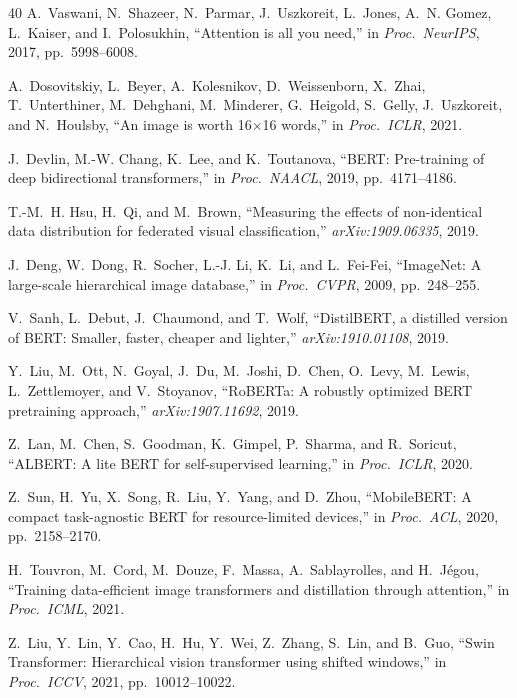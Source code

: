 \documentclass[conference]{IEEEtran}
\begin{document}
\begin{thebibliography}{40}
A.~Vaswani, N.~Shazeer, N.~Parmar, J.~Uszkoreit, L.~Jones,
A.~N. Gomez, L.~Kaiser, and I.~Polosukhin,
``Attention is all you need,''
in \emph{Proc.\ NeurIPS}, 2017, pp.\ 5998--6008.

A.~Dosovitskiy, L.~Beyer, A.~Kolesnikov, D.~Weissenborn, X.~Zhai,
T.~Unterthiner, M.~Dehghani, M.~Minderer, G.~Heigold, S.~Gelly,
J.~Uszkoreit, and N.~Houlsby,
``An image is worth 16$\times$16 words,'' in \emph{Proc.\ ICLR}, 2021.

J.~Devlin, M.-W. Chang, K.~Lee, and K.~Toutanova,
``BERT: Pre-training of deep bidirectional transformers,''
in \emph{Proc.\ NAACL}, 2019, pp.\ 4171--4186.

T.-M.~H. Hsu, H.~Qi, and M.~Brown,
``Measuring the effects of non-identical data distribution for federated
visual classification,'' \emph{arXiv:1909.06335}, 2019.

J.~Deng, W.~Dong, R.~Socher, L.-J. Li, K.~Li, and L.~Fei-Fei,
``ImageNet: A large-scale hierarchical image database,''
in \emph{Proc.\ CVPR}, 2009, pp.\ 248--255.

V.~Sanh, L.~Debut, J.~Chaumond, and T.~Wolf,
``DistilBERT, a distilled version of BERT: Smaller, faster, cheaper and lighter,''
\emph{arXiv:1910.01108}, 2019.

Y.~Liu, M.~Ott, N.~Goyal, J.~Du, M.~Joshi, D.~Chen, O.~Levy,
M.~Lewis, L.~Zettlemoyer, and V.~Stoyanov,
``RoBERTa: A robustly optimized BERT pretraining approach,''
\emph{arXiv:1907.11692}, 2019.

Z.~Lan, M.~Chen, S.~Goodman, K.~Gimpel, P.~Sharma, and R.~Soricut,
``ALBERT: A lite BERT for self-supervised learning,''
in \emph{Proc.\ ICLR}, 2020.

Z.~Sun, H.~Yu, X.~Song, R.~Liu, Y.~Yang, and D.~Zhou,
``MobileBERT: A compact task-agnostic BERT for resource-limited devices,''
in \emph{Proc.\ ACL}, 2020, pp.\ 2158--2170.

H.~Touvron, M.~Cord, M.~Douze, F.~Massa, A.~Sablayrolles, and H.~J{\'e}gou,
``Training data-efficient image transformers and distillation through attention,''
in \emph{Proc.\ ICML}, 2021.

Z.~Liu, Y.~Lin, Y.~Cao, H.~Hu, Y.~Wei, Z.~Zhang, S.~Lin, and B.~Guo,
``Swin Transformer: Hierarchical vision transformer using shifted windows,''
in \emph{Proc.\ ICCV}, 2021, pp.\ 10012--10022.


\end{thebibliography}
\end{document}

